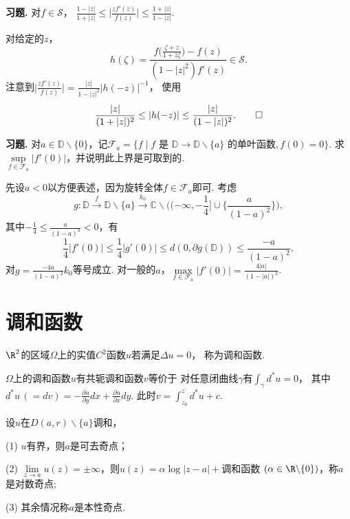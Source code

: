 \textbf{习题. } 对$f\in\mathcal{S}$，
$\displaystyle{\frac{1-|z|}{1+|z|}\leq\bigg|\frac{zf'(z)}{f(z)}\bigg|\leq\frac{1+|z|}{1-|z|}}$.

\begin{proofc}
    对给定的$z$，$$h(\zeta)
    =\frac{f\big(\frac{\zeta+z}{1+\bar{z}\zeta}\big)-f(z)}{(1-|z|^2)f'(z)}\in\mathcal{S}.$$
    注意到$\displaystyle{\bigg|\frac{zf'(z)}{f(z)}\bigg|=\frac{|z|}{1-|z|^2}|h(-z)|^{-1}}$，
    使用$$\frac{|z|}{(1+|z|)^2}\leq|h(-z)|\leq\frac{|z|}{(1-|z|)^2}.\qedhere$$
\end{proofc}

\textbf{习题. } 对$a\in\mathbb{D}\backslash\{0\}$，记$\mathcal{F}_a=\{f\mid 
f\text{ 是 }\mathbb{D}\rightarrow\mathbb{D}\backslash\{a\}\text{ 的单叶函数},f(0)=0\}$. 
求$\sup\limits_{f\in\mathcal{F}_a}|f'(0)|$，并说明此上界是可取到的.

\begin{proofc}
    先设$a<0$以方便表述，因为旋转全体$f\in\mathcal{F}_a$即可. 考虑
    $$g\colon\mathbb{D}\xrightarrow{f}\mathbb{D}\backslash\{a\}\xrightarrow{k_0}
    \mathbb{C}\backslash\big((-\infty,-\frac{1}{4}]\cup\big\{\frac{a}{(1-a)^2}\big\}\big),$$
    其中$-\frac{1}{4}\leq\frac{a}{(1-a)^2}<0$，有$$\frac{1}{4}|f'(0)|\leq
    \frac{1}{4}|g'(0)|\leq d(0,\partial g(\mathbb{D}))\leq\frac{-a}{(1-a)^2},$$
    对$g=\frac{-4a}{(1-a)^2}k_0$等号成立. 
    对一般的$a$，$\max\limits_{f\in\mathcal{F}_a}|f'(0)|=\frac{4|a|}{(1-|a|)^2}$.
\end{proofc}

\section{调和函数}

\begin{definition}$\R^2$的区域$\Omega$上的实值$C^2$函数$u$若满足$\Delta u=0$，
称为调和函数.\end{definition}

\begin{proposition}$\Omega$上的调和函数$u$有共轭调和函数$v$等价于
对任意闭曲线$\gamma$有$\displaystyle{\int_\gamma d^*u=0}$，
其中$\displaystyle{d^*u\,(=dv)=-\frac{\partial u}{\partial y}dx+\frac{\partial u}{\partial x}dy}$.
此时$\displaystyle{v=\int_{z_0}^z d^*u+c}$.\end{proposition}

\begin{proposition}设$u$在$D(a,r)\backslash\{a\}$调和，

(1) $u$有界，则$a$是可去奇点；

(2) $\lim\limits_{z\rightarrow a}u(z)=\pm\infty$，则$u(z)=\alpha\log|z-a|+$调和函数
$(\alpha\in\R\backslash\{0\})$，称$a$是对数奇点;

(3) 其余情况称$a$是本性奇点.\end{proposition}

